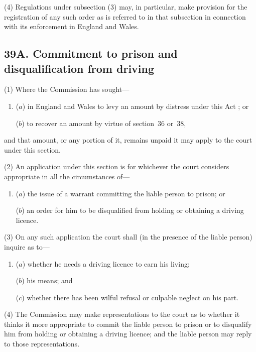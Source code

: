 \documentclass[12pt,a4paper]{article}
\begin{document}
(4) Regulations under subsection (3)  may, in particular, make provision for the registration of any such order as is referred to in that subsection in connection with its enforcement in England and Wales.


\subsection[39A. Commitment to prison and disqualification from driving]{\sloppy 39A. Commitment to prison and disqualification from driving}

(1) Where the 
Commission  %
has sought—
\begin{enumerate}\item[]
($a$) in England and Wales to 
levy an amount by distress under this Act%
; or

($b$) to recover an amount by virtue of section~36 or~38,
\end{enumerate}
and that amount, or any portion of it, remains unpaid 
it  %
may apply to the court under this section.

(2) An application under this section is for whichever the court considers appropriate in all the circumstances of—
\begin{enumerate}\item[]
($a$) the issue of a warrant committing the liable person to prison; or

($b$) an order for him to be disqualified from holding or obtaining a driving licence.
\end{enumerate}

(3) On any such application the court shall (in the presence of the liable person) inquire as to—
\begin{enumerate}\item[]
($a$) whether he needs a driving licence to earn his living;

($b$) his means; and

($c$) whether there has been wilful refusal or culpable neglect on his part.
\end{enumerate}

(4) The 
Commission  %
may make representations to the court as to whether 
it  %
thinks it more appropriate to commit the liable person to prison or to disqualify him from holding or obtaining a driving licence; and the liable person may reply to those representations.
\end{document}
